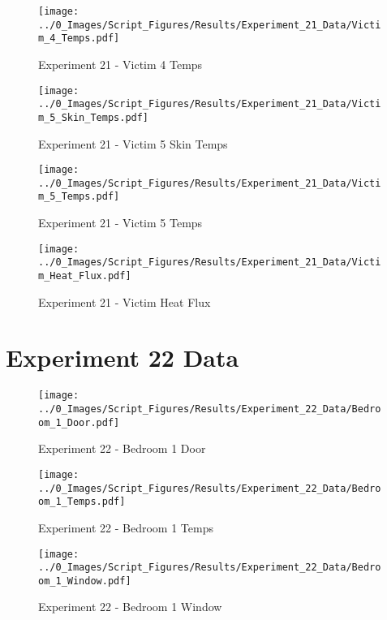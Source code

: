 	\clearpage

	\begin{figure}[H]
		\centering
		\texttt{[image: ../0\_Images/Script\_Figures/Results/Experiment\_21\_Data/Victim\_4\_Temps.pdf]}
		\caption[]{Experiment 21 - Victim 4 Temps}
	\end{figure}
 

	\begin{figure}[H]
		\centering
		\texttt{[image: ../0\_Images/Script\_Figures/Results/Experiment\_21\_Data/Victim\_5\_Skin\_Temps.pdf]}
		\caption[]{Experiment 21 - Victim 5 Skin Temps}
	\end{figure}
 
	\clearpage

	\begin{figure}[H]
		\centering
		\texttt{[image: ../0\_Images/Script\_Figures/Results/Experiment\_21\_Data/Victim\_5\_Temps.pdf]}
		\caption[]{Experiment 21 - Victim 5 Temps}
	\end{figure}
 

	\begin{figure}[H]
		\centering
		\texttt{[image: ../0\_Images/Script\_Figures/Results/Experiment\_21\_Data/Victim\_Heat\_Flux.pdf]}
		\caption[]{Experiment 21 - Victim Heat Flux}
	\end{figure}
 
	\clearpage

\clearpage		\large
\section{Experiment 22 Data} \label{App:Exp22Results} 

	\begin{figure}[H]
		\centering
		\texttt{[image: ../0\_Images/Script\_Figures/Results/Experiment\_22\_Data/Bedroom\_1\_Door.pdf]}
		\caption[]{Experiment 22 - Bedroom 1 Door}
	\end{figure}
 

	\begin{figure}[H]
		\centering
		\texttt{[image: ../0\_Images/Script\_Figures/Results/Experiment\_22\_Data/Bedroom\_1\_Temps.pdf]}
		\caption[]{Experiment 22 - Bedroom 1 Temps}
	\end{figure}
 
	\clearpage

	\begin{figure}[H]
		\centering
		\texttt{[image: ../0\_Images/Script\_Figures/Results/Experiment\_22\_Data/Bedroom\_1\_Window.pdf]}
		\caption[]{Experiment 22 - Bedroom 1 Window}
	\end{figure}
 


